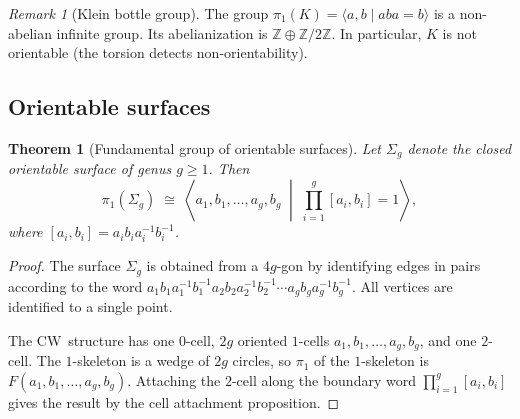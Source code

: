 \documentclass[12pt,a4paper,openany]{book}
\theoremstyle{definition}
\theoremstyle{plain}
\newtheorem{theorem}[definition]{Theorem}
\theoremstyle{remark}
\newtheorem{remark}[definition]{Remark}
\newcommand{\Z}{\mathbb{Z}}
\begin{document}
\begin{remark}[Klein bottle group]\label{rem:klein-nonabelian}
  The group $\pi_1(K) = \langle a, b \mid aba = b \rangle$ is a non-abelian
  infinite group.  Its abelianization is $\Z \oplus \Z/2\Z$.  In particular,
  $K$ is not orientable (the torsion detects non-orientability).
\end{remark}

\subsection{Orientable surfaces}\label{subsec:surfaces}

\begin{theorem}[Fundamental group of orientable surfaces]\label{thm:pi1-surface}
  Let $\Sigma_g$ denote the closed orientable surface of genus $g \geq 1$.
  Then
  \[
    \pi_1(\Sigma_g) \;\cong\;
    \left\langle a_1, b_1, \ldots, a_g, b_g \;\middle|\;
    \prod_{i=1}^{g} [a_i, b_i] = 1 \right\rangle,
  \]
  where $[a_i, b_i] = a_i b_i a_i^{-1} b_i^{-1}$.
\end{theorem}

\begin{proof}
  The surface $\Sigma_g$ is obtained from a $4g$-gon by identifying edges in
  pairs according to the word
  $a_1 b_1 a_1^{-1} b_1^{-1} a_2 b_2 a_2^{-1} b_2^{-1} \cdots a_g b_g
  a_g^{-1} b_g^{-1}$.  All vertices are identified to a single point.

  \begin{center}
  \end{center}

  The CW~structure has one $0$-cell, $2g$ oriented $1$-cells
  $a_1, b_1, \ldots, a_g, b_g$, and one $2$-cell.  The $1$-skeleton is a wedge
  of $2g$ circles, so $\pi_1$ of the $1$-skeleton is $F(a_1, b_1, \ldots,
  a_g, b_g)$.  Attaching the $2$-cell along the boundary word
  $\prod_{i=1}^g [a_i, b_i]$ gives the result by the cell attachment
  proposition.
\end{proof}
\end{document}
